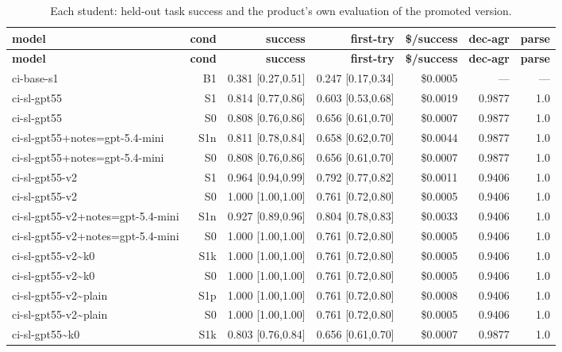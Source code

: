 \documentclass[11pt]{article}
\begin{document}
{\scriptsize\setlength{\tabcolsep}{3pt}
\begin{longtable}{lrrrrrr}
\caption{Each student: held-out task success and the product's own evaluation of the promoted version.}\label{tab:students} \\
\toprule
\textbf{model} & \textbf{cond} & \textbf{success} & \textbf{first-try} & \textbf{\$/success} & \textbf{dec-agr} & \textbf{parse} \\
\midrule
\endfirsthead
\toprule
\textbf{model} & \textbf{cond} & \textbf{success} & \textbf{first-try} & \textbf{\$/success} & \textbf{dec-agr} & \textbf{parse} \\
\midrule
\endhead
\bottomrule
\endfoot
ci-base-s1 & B1 & 0.381 [0.27,0.51] & 0.247 [0.17,0.34] & \$0.0005 & --- & --- \\
ci-sl-gpt55 & S1 & 0.814 [0.77,0.86] & 0.603 [0.53,0.68] & \$0.0019 & 0.9877 & 1.0 \\
ci-sl-gpt55 & S0 & 0.808 [0.76,0.86] & 0.656 [0.61,0.70] & \$0.0007 & 0.9877 & 1.0 \\
ci-sl-gpt55+notes=gpt-5.4-mini & S1n & 0.811 [0.78,0.84] & 0.658 [0.62,0.70] & \$0.0044 & 0.9877 & 1.0 \\
ci-sl-gpt55+notes=gpt-5.4-mini & S0 & 0.808 [0.76,0.86] & 0.656 [0.61,0.70] & \$0.0007 & 0.9877 & 1.0 \\
ci-sl-gpt55-v2 & S1 & 0.964 [0.94,0.99] & 0.792 [0.77,0.82] & \$0.0011 & 0.9406 & 1.0 \\
ci-sl-gpt55-v2 & S0 & 1.000 [1.00,1.00] & 0.761 [0.72,0.80] & \$0.0005 & 0.9406 & 1.0 \\
ci-sl-gpt55-v2+notes=gpt-5.4-mini & S1n & 0.927 [0.89,0.96] & 0.804 [0.78,0.83] & \$0.0033 & 0.9406 & 1.0 \\
ci-sl-gpt55-v2+notes=gpt-5.4-mini & S0 & 1.000 [1.00,1.00] & 0.761 [0.72,0.80] & \$0.0005 & 0.9406 & 1.0 \\
ci-sl-gpt55-v2\textasciitilde{}k0 & S1k & 1.000 [1.00,1.00] & 0.761 [0.72,0.80] & \$0.0005 & 0.9406 & 1.0 \\
ci-sl-gpt55-v2\textasciitilde{}k0 & S0 & 1.000 [1.00,1.00] & 0.761 [0.72,0.80] & \$0.0005 & 0.9406 & 1.0 \\
ci-sl-gpt55-v2\textasciitilde{}plain & S1p & 1.000 [1.00,1.00] & 0.761 [0.72,0.80] & \$0.0008 & 0.9406 & 1.0 \\
ci-sl-gpt55-v2\textasciitilde{}plain & S0 & 1.000 [1.00,1.00] & 0.761 [0.72,0.80] & \$0.0005 & 0.9406 & 1.0 \\
ci-sl-gpt55\textasciitilde{}k0 & S1k & 0.803 [0.76,0.84] & 0.656 [0.61,0.70] & \$0.0007 & 0.9877 & 1.0 \\

\end{longtable}}
\end{document}
